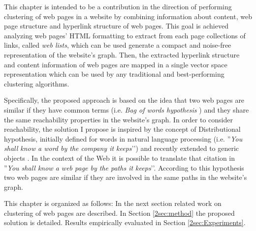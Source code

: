 This chapter is intended to be a contribution in the direction of performing clustering of web pages in a website by combining information about content, web page structure and hyperlink structure of web pages.
This goal is achieved analyzing web pages' HTML formatting to extract from each page collections of links, called \emph{web lists}, which can be used generate a compact and noise-free representation of the website's graph. Then, the extracted hyperlink structure and content information of web pages are mapped in a single vector space representation which can be used by any traditional and best-performing clustering algorithms.

Specifically, the proposed approach is based on the idea that two web pages are similar if they have common terms (i.e. \textit{Bag of words hypothesis} \cite{Turney:2010}) and they share the same reachability properties in the website's graph.
In order to consider reachability, the solution I propose is inspired by the concept of Distributional hypothesis, initially defined for words in natural language processing (i.e. ''\textit{You shall know a word by the company it keeps}\rq\rq)%
\cite{Firth:1957} and recently extended to generic objects \cite{Gornerup:2015}. In the context of the Web it is possible to translate that citation in ''\textit{You shall know a web page by the paths it keeps}\rq\rq. According to this hypothesis two web pages are similar if they are involved in the same paths in the website's graph.


This chapter is organized as follows: In the next section related work on clustering of web pages are described. In Section \ref{2sec:method} the proposed solution is detailed. Results empirically evaluated in Section \ref{2sec:Experiments}. %


